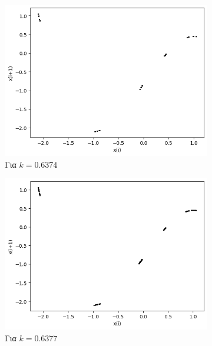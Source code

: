 \begin{figure}[ht]
\begin{subfigure}[b]{0.4\textwidth}
		\includegraphics[width=\textwidth]{LateX images/graphs q21/g6}
		\caption{Για $k=0.6374$}
		\label{f:k106}
	\end{subfigure}
	\hfill
	\begin{subfigure}[b]{0.4\textwidth}
		\centering
		\includegraphics[width=\textwidth]{LateX images/graphs q21/g7}
		\caption{Για $k=0.6377$}
		\label{f:k107}
	\end{subfigure}
	\hfill
	\begin{subfigure}[b]{0.4\textwidth}
		\centering

\end{subfigure}
\end{figure}
